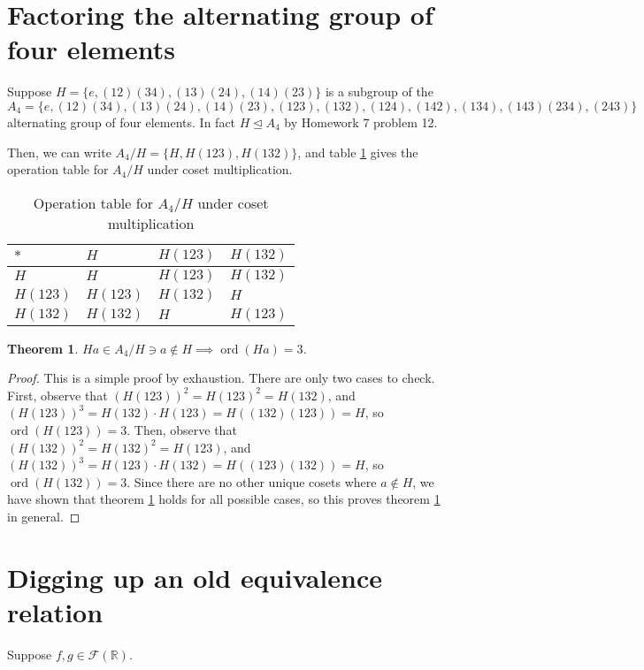 \documentclass[12pt]{article}
\newcommand{\reals}{\mathbb{R}}
\newcommand{\ord}{\operatorname{ord}}
\newcommand{\freals}{\mathcal{F}(\reals)}
\newtheorem{thm}{Theorem}
\begin{document}
\section{Factoring the alternating group of four elements}

Suppose $H = \{e, (12)(34), (13)(24), (14)(23) \}$ is a subgroup
of the $A_4 = \{e, (12)(34), (13)(24), (14)(23),(123),(132),(124),(142),(134),(143)(234),(243) \}$
alternating group of four elements.
In fact $H \trianglelefteq A_4$ by Homework 7 problem 12.

Then, we can write $A_4/H = \{H, H(123), H(132)\}$,
and table \ref{t4} gives the operation table for
$A_4/H$ under coset multiplication.

\begin{table}[!ht] 
\begin{tabular}{l|lll}
	$*$ & $H$ & $H(123)$ & $H(132)$ \\ \hline
	$H$ & $H$ & $H(123)$ & $H(132)$ \\
	$H(123)$ & $H(123)$ & $H(132)$ & $H$ \\
	$H(132)$ & $H(132)$ & $H$ & $H(123)$ \\
\end{tabular}
\centering
\caption{Operation table for $A_4/H$ under coset multiplication} 
\label{t4}
\end{table}

\begin{thm} \label{thm7}
	$Ha \in A_4/H \ni a \not\in H \implies \ord(Ha) = 3$.	
\end{thm}

\begin{proof}
	This is a simple proof by exhaustion.
	There are only two cases to check.
	First, observe that $(H(123))^2 = H(123)^2 = H(132)$,
	and $(H(123))^3 = H(132) \cdot H(123) = H((132)(123)) = H$,
	so $\ord(H(123)) = 3$.
	Then, observe that $(H(132))^2 = H(132)^2 = H(123)$,
	and $(H(132))^3 = H(123) \cdot H(132) = H((123)(132)) = H$,
	so $\ord(H(132)) = 3$.
	Since there are no other unique cosets where $a \not\in H$,
	we have shown that theorem \ref{thm7} holds for
	all possible cases, so this proves
	theorem \ref{thm7} in general.
\end{proof}

\section{Digging up an old equivalence relation}

Suppose $f,g \in \freals$.
\end{document}
